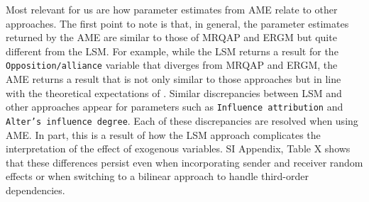 \documentclass[9pt,twocolumn,twoside,lineno]{pnas-new}
\begin{document}
Most relevant for us are how parameter estimates from AME relate to other approaches. The first point to note is that, in general, the parameter estimates returned by the AME are similar to those of MRQAP and ERGM but quite different from the LSM. For example, while the LSM returns a result for the \texttt{Opposition/alliance} variable that diverges from MRQAP and ERGM, the AME returns a result that is not only similar to those approaches but in line with the theoretical expectations of \citet{ingold:fischer:2014}. Similar discrepancies between LSM and other approaches appear for parameters such as \texttt{Influence attribution} and \texttt{Alter's influence degree}. Each of these discrepancies are resolved when using AME. In part, this is a result of how the LSM approach complicates the interpretation of the effect of exogenous variables. SI Appendix, Table X shows that these differences persist even when incorporating sender and receiver random effects or when switching to a bilinear approach to handle third-order dependencies.
\end{document}
